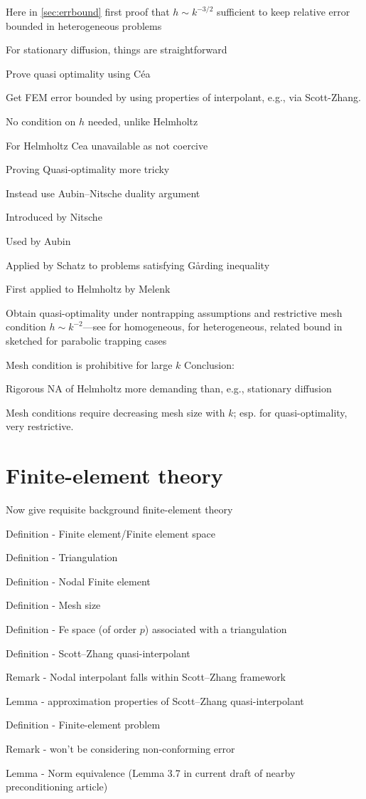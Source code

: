 \item Here in \cref{sec:errbound} first proof that $h\sim k^{-3/2}$ sufficient to keep relative error bounded in heterogeneous problems
\eit
\item For stationary diffusion, things are straightforward
\item Prove quasi optimality using C\'ea
\item Get FEM error bounded by using properties of interpolant, e.g., via Scott-Zhang.
\item No condition on $h$ needed, unlike Helmholtz
\item For Helmholtz Cea unavailable as not coercive
\item Proving Quasi-optimality more tricky
\item Instead use Aubin--Nitsche duality argument
\bit
\item Introduced by Nitsche
\item Used by Aubin
\item Applied by Schatz to problems satisfying G\r{a}rding inequality
\item First applied to Helmholtz by Melenk
\item Obtain quasi-optimality under nontrapping assumptions and restrictive mesh condition $h \sim k^{-2}$---see \cite[Proposition 8.2.7]{Me:95} for homogeneous, \cite[Theorem 3]{GaSpWu:18} for heterogeneous, related bound in \cite[Section 1.4]{ChSpGiSm:17} sketched for parabolic trapping cases
\item Mesh condition is prohibitive for large $k$
\eit
\eit
Conclusion:
\bit
\item Rigorous NA of Helmholtz more demanding than, e.g., stationary diffusion
\item Mesh conditions require decreasing mesh size with $k$; esp. for quasi-optimality, very restrictive.
\eit
\section{Finite-element theory}
Now give requisite background finite-element theory
\bit
\item Definition - Finite element/Finite element space
\item Definition - Triangulation
\item Definition - Nodal Finite element
\item Definition - Mesh size
\item Definition - Fe space (of order $p$) associated with a triangulation
\item Definition - Scott--Zhang quasi-interpolant
\item Remark - Nodal interpolant falls within Scott--Zhang framework
\item Lemma - approximation properties of Scott--Zhang quasi-interpolant
\item Definition - Finite-element problem
\item Remark - won't be considering non-conforming error
\item Lemma - Norm equivalence (Lemma 3.7 in current draft of nearby preconditioning article)
\eit

